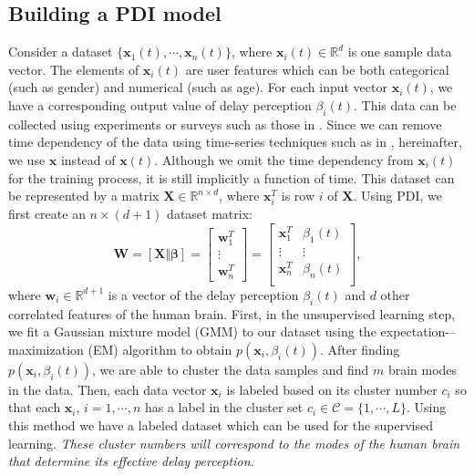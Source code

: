 \documentclass[journal,draftclsnofoot,onecolumn,12pt]{IEEEtran}%
\newcommand{\xb}{\boldsymbol{x}}
\newcommand{\Xb}{\boldsymbol{X}}
\begin{document}
    	

	
    \subsection{{Building a PDI model}}	
	 Consider a dataset $\{\xb_1(t),\cdots,\xb_n(t)\}$, where $\xb_i(t)\in \mathds{R}^d$ is one sample data vector. The elements of $\xb_i(t)$ are {user} features which can be both categorical (such as gender) and numerical (such as age). For each input vector $\xb_i(t)$, we have a corresponding output value of delay perception $\beta_i(t)$.  This data can be collected using experiments or surveys such as those in \cite{yang2015prospect}. Since we can remove time dependency of the data using time-series techniques {such as in \cite{Baydogan2015}}, hereinafter, we use $\xb$ instead of $\xb(t)$. {Although we omit the time dependency from $\xb_i(t)$ for the training process, it is still implicitly a function of time.} This dataset can be represented by a matrix $\Xb \in \mathds{R}^{n\times d}$, where $\xb_i^T$ is row $i$ of $\Xb$.
	Using PDI, we first create an $n\times(d+1)$ dataset matrix:
	\begin{equation}\label{eq:define w}
	\boldsymbol{W}=[\boldsymbol{X} \Vert \boldsymbol{\beta}]=
	\begin{bmatrix}
	\boldsymbol{w}_1^T\\
	\vdots\\
	\boldsymbol{w}_n^T
	\end{bmatrix}=
	\begin{bmatrix}
	\xb_1^T &\beta_1(t)\\
	\vdots &\vdots\\
	\xb_n^T &\beta_n(t)\\
	\end{bmatrix},
	\end{equation}
	where $\boldsymbol w_i \in \mathds{R}^{d+1}$ is   a vector of the delay perception $\beta_i(t)$ and $d$ other correlated features of the human brain.
	{First, in the unsupervised learning step, we fit a Gaussian mixture model (GMM) to our dataset using the expectation-–maximization (EM) algorithm  \cite{moon1996expectation} to obtain $p(\xb_i,\beta_i(t))$.}
	{After finding $p(\xb_i,\beta_i(t))$, we are able to cluster the data samples and find $m$ brain modes in the data. Then, each data vector $\xb_i$ is labeled based on its cluster number $c_i$ so that each $\xb_i, \,i=1,\cdots,n$ has a label in the cluster set $c_i\in \mathcal{C}=\{1,\cdots,L\}$. Using this method we have a labeled dataset which can be used for the supervised learning.
	\emph{These cluster numbers  will correspond to the modes of the human brain that determine its effective delay perception.} 
	}
\end{document}
